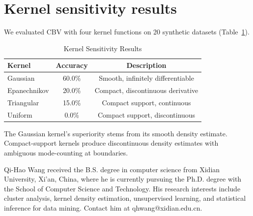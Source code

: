 \documentclass[journal]{IEEEtran}
\begin{document}
\section{Kernel sensitivity results}
\label{app:b}

We evaluated CBV with four kernel functions on 20 synthetic datasets (Table~\ref{tab:kernels}).

\begin{table}[t]
\centering
\caption{Kernel Sensitivity Results}
\label{tab:kernels}
\begin{tabular}{lcc}
\toprule
Kernel & Accuracy & Description\\
\midrule
Gaussian & 60.0\% & Smooth, infinitely differentiable\\
Epanechnikov & 20.0\% & Compact, discontinuous derivative\\
Triangular & 15.0\% & Compact support, continuous\\
Uniform & 0.0\% & Compact support, discontinuous\\
\bottomrule
\end{tabular}
\end{table}

The Gaussian kernel's superiority stems from its smooth density estimate. Compact-support kernels produce discontinuous density estimates with ambiguous mode-counting at boundaries.

\begin{IEEEbiographynophoto}{Qi-Hao Wang}
received the B.S. degree in computer science from Xidian University, Xi'an, China, where he is currently pursuing the Ph.D. degree with the School of Computer Science and Technology. His research interests include cluster analysis, kernel density estimation, unsupervised learning, and statistical inference for data mining. Contact him at qhwang@xidian.edu.cn.
\end{IEEEbiographynophoto}
\end{document}
